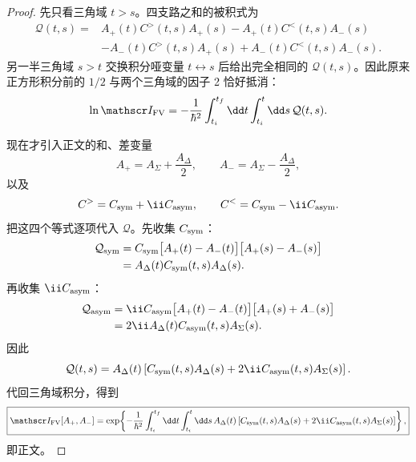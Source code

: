 \begin{proof}
先只看三角域 $t>s$。四支路之和的被积式为
\begin{align*}
\mathcal Q(t,s)
={}&A_+(t)C^>(t,s)A_+(s)
-A_+(t)C^<(t,s)A_-(s)\\
&-A_-(t)C^>(t,s)A_+(s)
+A_-(t)C^<(t,s)A_-(s).
\end{align*}
另一半三角域 $s>t$ 交换积分哑变量 $t\leftrightarrow s$ 后给出完全相同的 $\mathcal Q(t,s)$。因此原来正方形积分前的 $1/2$ 与两个三角域的因子 2 恰好抵消：
\begin{equation*}
\ln\mathscr I_{\rm FV}
=-\frac{1}{\hbar^2}
\int_{t_i}^{t_f}\dd t\int_{t_i}^{t}\dd s\,
\mathcal Q(t,s).
\end{equation*}

现在才引入正文的和、差变量
\begin{equation*}
A_+=A_\Sigma+\frac{A_\Delta}{2},
\qquad
A_-=A_\Sigma-\frac{A_\Delta}{2},
\end{equation*}
以及
\begin{equation*}
C^>=C_{\rm sym}+\ii C_{\rm asym},
\qquad
C^<=C_{\rm sym}-\ii C_{\rm asym}.
\end{equation*}
把这四个等式逐项代入 $\mathcal Q$。先收集 $C_{\rm sym}$：
\begin{align*}
\mathcal Q_{\rm sym}
={}&C_{\rm sym}
\bigl[A_+(t)-A_-(t)\bigr]
\bigl[A_+(s)-A_-(s)\bigr]\\
={}&A_\Delta(t)C_{\rm sym}(t,s)A_\Delta(s).
\end{align*}
再收集 $\ii C_{\rm asym}$：
\begin{align*}
\mathcal Q_{\rm asym}
={}&\ii C_{\rm asym}
\bigl[A_+(t)-A_-(t)\bigr]
\bigl[A_+(s)+A_-(s)\bigr]\\
={}&2\ii A_\Delta(t)C_{\rm asym}(t,s)A_\Sigma(s).
\end{align*}
因此
\begin{equation*}
\mathcal Q(t,s)
=A_\Delta(t)
\left[
C_{\rm sym}(t,s)A_\Delta(s)
+2\ii C_{\rm asym}(t,s)A_\Sigma(s)
\right].
\end{equation*}
代回三角域积分，得到
\begin{equation*}
\boxed{
\mathscr I_{\rm FV}[A_+,A_-]
=\exp\!\left\{-\frac{1}{\hbar^2}
\int_{t_i}^{t_f}\dd t\int_{t_i}^{t}\dd s\,
A_\Delta(t)
\left[
C_{\rm sym}(t,s)A_\Delta(s)
+2\ii C_{\rm asym}(t,s)A_\Sigma(s)
\right]
\right\},}
\end{equation*}
即正文。
\end{proof}


